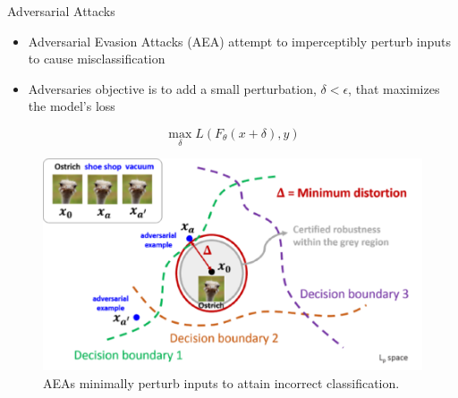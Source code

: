 \documentclass{beamer}
\begin{document}

\begin{frame}{Adversarial Attacks}
	
	\begin{itemize}
		\item Adversarial Evasion Attacks (AEA) attempt to imperceptibly perturb inputs to cause misclassification
		\item Adversaries objective is to add a small perturbation, $\delta < \epsilon$, that maximizes the model's loss
	\end{itemize}

	$$\max_{\delta} L(F_\theta(x+\delta), y)$$
	
	
\end{frame}


\begin{frame}{}
	
	\begin{figure}
		\centering
		\includegraphics[scale=.7]{./images/adversarial_attack.png}
		\caption{AEAs minimally perturb inputs to attain incorrect classification.}
	\end{figure}
	
\end{frame}

\end{document}
